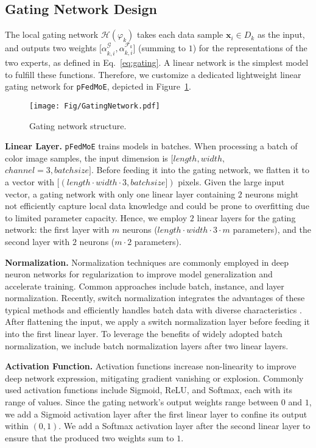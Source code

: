 \documentclass[sigconf]{acmart}
\newcommand{\reps}{representations }
\newcommand{\methodname}{{\tt{pFedMoE}}}
\begin{document}
\subsection{Gating Network Design}
The local gating network $\mathcal{H}(\varphi_k)$ takes each data sample $\boldsymbol{x}_i\in D_k$ as the input, and outputs two weights ${[\alpha}_{k,i}^{\mathcal{G}},\alpha_{k,i}^{\mathcal{F}_k}]$ (summing to $1$) for the \reps of the two experts, as defined in Eq.~\eqref{eq:gating}. A linear network is the simplest model to fulfill these functions. Therefore, we customize a dedicated lightweight linear gating network for \methodname{}, depicted in Figure~\ref{fig:GatingNetwork}.

\begin{figure}[!t]
\centering
\texttt{[image: Fig/GatingNetwork.pdf]}
\vspace{-2em}
\caption{Gating network structure.}
\label{fig:GatingNetwork}
\vspace{-2em}
\end{figure}

\textbf{Linear Layer.} \methodname{} trains models in batches. When processing a batch of color image samples, the input dimension is $[length, width,$ $channel=3, batch size]$. Before feeding it into the gating network, we flatten it to a vector with $[(length \cdot width \cdot 3, batch size])$ pixels. Given the large input vector, a gating network with only one linear layer containing $2$ neurons might not efficiently capture local data knowledge and could be prone to overfitting due to limited parameter capacity. Hence, we employ $2$ linear layers for the gating network: the first layer with $m$ neurons ($length \cdot width \cdot 3 \cdot m$ parameters), and the second layer with $2$ neurons ($m \cdot 2$ parameters).

\textbf{Normalization.} Normalization techniques are commonly employed in deep neuron networks for regularization to improve model generalization and accelerate training. Common approaches include batch, instance, and layer normalization. Recently, switch normalization \cite{switchnorm} integrates the advantages of these typical methods and efficiently handles batch data with diverse characteristics \cite{pFedGate}. After flattening the input, we apply a switch normalization layer before feeding it into the first linear layer. To leverage the benefits of widely adopted batch normalization, we include batch normalization layers after two linear layers.


\textbf{Activation Function.} Activation functions increase non-linearity to improve deep network expression, mitigating gradient vanishing or explosion. Commonly used activation functions include Sigmoid, ReLU, and Softmax, each with its range of values. Since the gating network's output weights range between $0$ and $1$, we add a Sigmoid activation layer after the first linear layer to confine its output within $(0,1)$. We add a Softmax activation layer after the second linear layer to ensure that the produced two weights sum to $1$.
\end{document}
